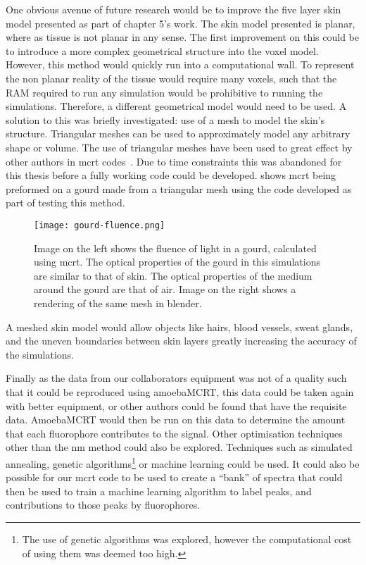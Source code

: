 One obvious avenue of future research would be to improve the five layer skin model presented as part of chapter 5's work.
The skin model presented is planar, where as tissue is not planar in any sense.
The first improvement on this could be to introduce a more complex geometrical structure into the voxel model.
However, this method would quickly run into a computational wall.
To represent the non planar reality of the tissue would require many voxels, such that the RAM required to run any simulation would be prohibitive to running the simulations.
Therefore, a different geometrical model would need to be used.
A solution to this was briefly investigated: use of a mesh to model the skin's structure.
Triangular meshes can be used to approximately model any arbitrary shape or volume.
The use of triangular meshes have been used to great effect by other authors in \gls*{mcrt} codes~\cite{badal2009penmesh,margallo2007shape}.
Due to time constraints this was abandoned for this thesis before a fully working code could be developed.
 shows \gls*{mcrt} being preformed on a gourd made from a triangular mesh using the code developed as part of testing this method.

\begin{figure}[!htpb]
    \centering
    \texttt{[image: gourd-fluence.png]}
    \caption{Image on the left shows the fluence of light in a gourd, calculated using \gls*{mcrt}. The optical properties of the gourd in this simulations are similar to that of skin. The optical properties of the medium around the gourd are that of air. Image on the right shows a rendering of the same mesh in blender.}
    \label{fig:mesh}
\end{figure}

A meshed skin model would allow objects like hairs, blood vessels, sweat glands, and the uneven boundaries between skin layers greatly increasing the accuracy of the simulations.

Finally as the data from our collaborators equipment was not of a quality such that it could be reproduced using amoebaMCRT, this data could be taken again with better equipment, or other authors could be found that have the requisite data. 
AmoebaMCRT would then be run on this data to determine the amount that each fluorophore contributes to the signal.
Other optimisation techniques other than the \gls*{nm} method could also be explored.
Techniques such as simulated annealing, genetic algorithms\footnote{The use of genetic algorithms was explored, however the computational cost of using them was deemed too high.} or machine learning could be used.
It could also be possible for our \gls*{mcrt} code to be used to create a ``bank'' of spectra that could then be used to train a machine learning algorithm to label peaks, and contributions to those peaks by fluorophores.


